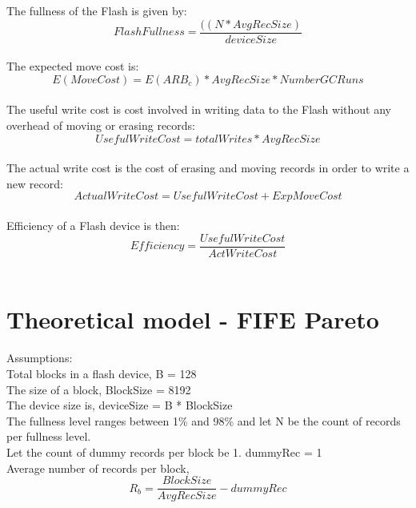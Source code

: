 \documentclass[11pt]{report} %
\begin{document}
The fullness of the Flash is given by:
\begin{equation}FlashFullness = \frac{((N * AvgRecSize)}{deviceSize}\end{equation}\\

The expected move cost is:
\begin{equation}E(MoveCost) = E(ARB_c) * AvgRecSize * NumberGCRuns\end{equation}\\

The useful write cost is cost involved in writing data to the Flash without any overhead of moving or erasing records: \begin{equation}UsefulWriteCost = totalWrites * AvgRecSize\end{equation}\\

The actual write cost is the cost of erasing and moving records in order to write a new record:
\begin{equation}ActualWriteCost = UsefulWriteCost + ExpMoveCost\end{equation}\\

Efficiency of a Flash device is then:
\begin{equation}Efficiency = \frac{UsefulWriteCost}{ActWriteCost}\end{equation}\\


\section{Theoretical model - FIFE Pareto}
Assumptions:\\
Total blocks in a flash device, B = 128\\
The size of a block, BlockSize = 8192\\
The device size is, deviceSize = B * BlockSize\\
The fullness level ranges between 1\% and 98\% and let N be the count of records per fullness level.\\
Let the count of dummy records per block be 1. dummyRec = 1\\
Average number of records per block, 
\begin{equation}R_b = \frac{BlockSize}{AvgRecSize} - dummyRec\end{equation}\\
\end{document}
